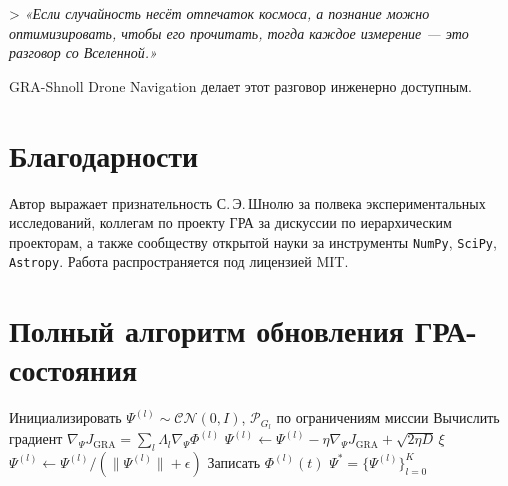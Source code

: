 \documentclass[12pt,a4paper]{article}
\newcommand{\GRA}{\text{GRA}}
\newcommand{\cP}{\mathcal{P}}
\theoremstyle{plain}
\theoremstyle{definition}
\begin{document}
> \emph{«Если случайность несёт отпечаток космоса, а познание можно оптимизировать, чтобы его прочитать, тогда каждое измерение --- это разговор со Вселенной.»}

GRA-Shnoll Drone Navigation делает этот разговор инженерно доступным.

\section*{Благодарности}
Автор выражает признательность С.\,Э.\,Шнолю за полвека экспериментальных исследований, коллегам по проекту ГРА за дискуссии по иерархическим проекторам, а также сообществу открытой науки за инструменты \texttt{NumPy}, \texttt{SciPy}, \texttt{Astropy}. Работа распространяется под лицензией MIT.

\appendix

\section{Полный алгоритм обновления ГРА-состояния}
\label{app:gra-algo}
\begin{algorithm}[H]
\caption{Рекурсивное обнуление ГРА}
\begin{algorithmic}[1]
\State Инициализировать $\Psi^{(l)} \sim \mathcal{CN}(0, I)$, $\cP_{G_l}$ по ограничениям миссии
    \State Вычислить градиент $\nabla_{\Psi} J_{\GRA} = \sum_l \Lambda_l \nabla_{\Psi} \Phi^{(l)}$
    \State $\Psi^{(l)} \leftarrow \Psi^{(l)} - \eta \nabla_{\Psi} J_{\GRA} + \sqrt{2\eta D}\,\xi$
    \State $\Psi^{(l)} \leftarrow \Psi^{(l)} / (\|\Psi^{(l)}\| + \epsilon)$
    \State Записать $\Phi^{(l)}(t)$
\EndFor
\State \Return $\Psi^* = \{\Psi^{(l)}\}_{l=0}^K$
\end{algorithmic}
\end{algorithm}
\end{document}

